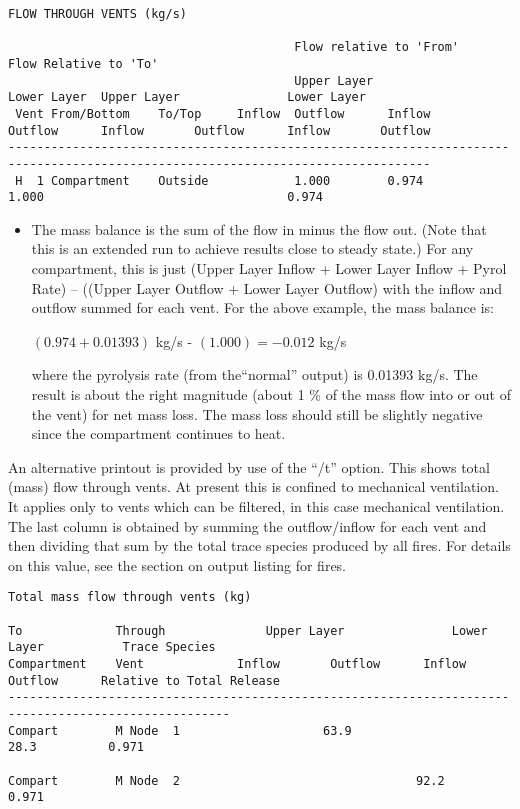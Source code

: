 \begin{lstlisting}[basicstyle=\tiny]
 FLOW THROUGH VENTS (kg/s)

                                        Flow relative to 'From'                Flow Relative to 'To'
                                        Upper Layer               Lower Layer  Upper Layer               Lower Layer
 Vent From/Bottom    To/Top     Inflow  Outflow      Inflow       Outflow      Inflow       Outflow      Inflow       Outflow
---------------------------------------------------------------------------------------------------------------------------------
 H  1 Compartment    Outside            1.000        0.974                     1.000                                  0.974
\end{lstlisting}

\begin{itemize}
\item The mass balance is the sum of the flow in minus the flow out. (Note that this is an extended run to achieve results close to steady state.) For any compartment, this is just (Upper Layer Inflow + Lower Layer Inflow + Pyrol Rate) – ((Upper Layer Outflow + Lower Layer Outflow) with the inflow and outflow summed for each vent. For the above example, the mass balance is:

$(0.974 + 0.01393)$ kg/s - $(1.000) = -0.012$ kg/s

where the pyrolysis rate (from the``normal'' output) is 0.01393 kg/s. The result is about the right magnitude (about 1 \% of the mass flow into or out of the vent) for net mass loss.  The mass loss should still be slightly negative since the compartment continues to heat.
\end{itemize}

An alternative printout is provided by use of the ``/t'' option. This shows total (mass) flow through vents. At present this is confined to mechanical ventilation. It applies only to vents which can be filtered, in this case mechanical ventilation. The last column is obtained by summing the outflow/inflow for each vent and then dividing that sum by the total trace species produced by all fires. For details on this value, see the section on output listing for fires.

\begin{lstlisting}[basicstyle=\tiny]
Total mass flow through vents (kg)

To             Through              Upper Layer               Lower Layer           Trace Species
Compartment    Vent             Inflow       Outflow      Inflow       Outflow      Relative to Total Release
-----------------------------------------------------------------------------------------------------
Compart        M Node  1                    63.9                      28.3          0.971

Compart        M Node  2                                 92.2                       0.971
\end{lstlisting}

